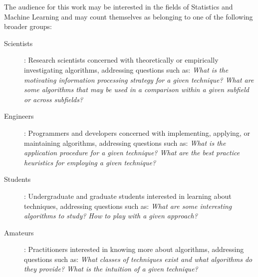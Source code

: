 The audience for this work may be interested in the fields of Statistics and Machine Learning and may count themselves as belonging to one of the following broader groups:

\begin{description}
	\item[Scientists]: Research scientists concerned with theoretically or empirically investigating algorithms, addressing questions such as: \emph{What is the motivating information processing strategy for a given technique? What are some algorithms that may be used in a comparison within a given subfield or across subfields?}
	\item[Engineers]: Programmers and developers concerned with implementing, applying, or maintaining algorithms, addressing questions such as: \emph{What is the application procedure for a given technique? What are the best practice heuristics for employing a given technique?}
	\item[Students]: Undergraduate and graduate students interested in learning about techniques, addressing questions such as: \emph{What are some interesting algorithms to study? How to play with a given approach?}
	\item[Amateurs]: Practitioners interested in knowing more about algorithms, addressing questions such as: \emph{What classes of techniques exist and what algorithms do they provide? What is the intuition of a given technique?}
\end{description}
